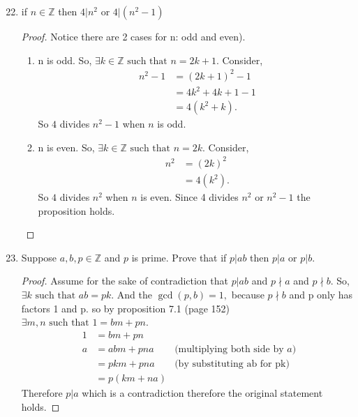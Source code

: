 \documentclass{article}
\newcommand{\Z}{\mathbb{Z}}
\newcommand{\st}{\text{ such that }}
\begin{document}
\begin{enumerate}
		\setcounter{enumi}{21}
		\item  if $n \in \Z$ then $4|n^2$ or $4|(n^2-1)$
		\begin{proof}
			Notice there are 2 cases for n: odd and even). 
			\begin{enumerate}[label={ Case \arabic*:}]
				\item n is odd. So, $\exists k \in \Z  \st n= 2k+1$. Consider,
					\begin{align*}
						n^2-1 &= (2k+1)^2-1\\
							  &= 4k^2+ 4k +1-1\\
							  &= 4(k^2+k).
					\end{align*}
					So $4$ divides $n^2-1$ when $n$ is odd. 
				\item n is even. So, $\exists k \in \Z  \st n= 2k$. Consider,
				\begin{align*}
					n^2 &= (2k)^2\\
					&= 4(k^2).
				\end{align*}
				So $4$ divides $n^2$ when $n$ is even. Since 4 divides $n^2$ or $n^2-1$ the proposition holds.
			\end{enumerate}
		\end{proof}
		
		
		\setcounter{enumi}{29}
		\item  Suppose $a,b,p \in \Z$ and $p$ is prime. Prove that if $p|ab$ then $p|a$ or $p|b$.
		\begin{proof}
			Assume for the sake of contradiction  that $p|ab$ and $p\nmid a$ and $p \nmid b$. So, $\exists k \st ab = pk.$ And the $\gcd(p, b)=1,$ because $p\nmid b$ and p only has factors 1 and p. so by proposition 7.1 (page 152) $\exists m, n \st 1 = bm + pn$.
			\begin{align*}
				1 &= bm + pn\\
				a &= abm + pna & \text{(multiplying both side by $a$)}\\
				  &= pkm + pna & \text{(by substituting ab for pk)}\\
				  &= p(km+na) 				 
			\end{align*}
			Therefore $p|a$ which is a contradiction therefore the original statement holds.
		\end{proof}
		

\end{enumerate}
\end{document}
